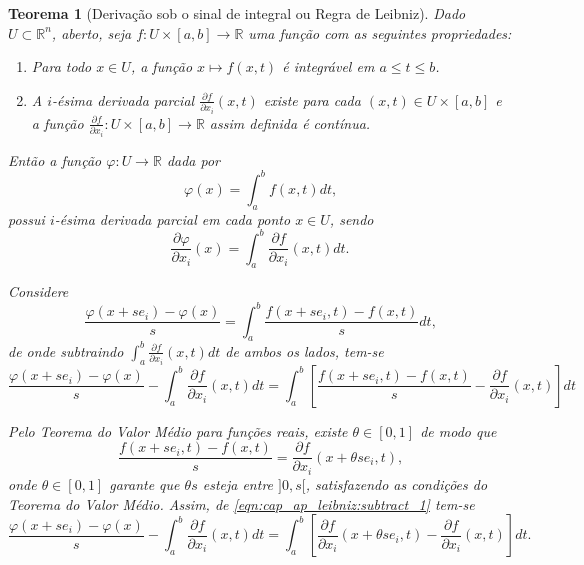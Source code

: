 \documentclass[
	12pt,				%
	openright,			%
    twoside,			%
	a4paper,			%
	chapter=TITLE,		%
	english,			%
	french,				%
	spanish,			%
	brazil				%
	]{abntex2}
\makeatletter
\newtheorem{teorema}{Teorema}
\renewenvironment{proof}[1][\proofname]{
	\par\pushQED{\qed}%
	\normalfont \topsep6\p@\@plus6\p@\relax
	\trivlist
	\item\relax
		{\itshape
			#1\@addpunct{.}}\hspace\labelsep\ignorespaces
}{%
	\popQED\endtrivlist\@endpefalse
}
\numberwithin{lema}{chapter}
\numberwithin{teorema}{chapter}
\numberwithin{definicao}{chapter}
\numberwithin{exemplo}{chapter}
\numberwithin{figure}{chapter}
\makeatother
\begin{document}
\begin{apendicesenv}
{	\begin{teorema}[Derivação sob o sinal de integral ou Regra de Leibniz]
		\label{teorema:regra_de_leibniz}
		Dado $U\subset \mathbb{R}^n$, aberto, seja $f:U\times[a,b]\longrightarrow \mathbb{R}$ uma função com as seguintes propriedades:
		\begin{enumerate}
			\item Para todo $x \in U$, a função $x \longmapsto f(x,t)$ é integrável em $a \leqslant t \leqslant b$.
			\item A $i$-ésima derivada parcial $\frac{\partial f}{\partial x_i}(x,t)$ existe para cada $(x,t)\in U\times [a,b]$ e a função $\frac{\partial f}{\partial x_i}:U\times [a,b]\longrightarrow \mathbb{R}$ assim definida é contínua.
		\end{enumerate}
		Então a função $\varphi: U\longrightarrow \mathbb{R}$ dada por
		$$\varphi(x)=\int_a^b f(x,t)dt\text{,}$$
		possui $i$-ésima derivada parcial em cada ponto $x\in U$, sendo
		$$\frac{\partial \varphi}{\partial x_i}(x)=\int_a^b \frac{\partial f}{\partial x_i}(x,t)dt\text{.}$$

		\begin{proof}
			Considere
			$$
			\frac{\varphi(x+se_i)-\varphi(x)}{s}
			=
			\int_a^b \frac{f(x+se_i, t)-f(x,t)}{s} dt\text{,}
			$$
			de onde subtraindo $\displaystyle \int_a^b \frac{\partial f}{\partial x_i}(x,t) dt$ de ambos os lados, tem-se
			\begin{equation}
			\label{eqn:cap_ap_leibniz:subtract_1}
			\frac{\varphi(x+se_i)-\varphi(x)}{s}
			- \int_a^b \frac{\partial f}{\partial x_i}(x,t) dt
			=
			\int_a^b \left [ 
				\frac{f(x+se_i, t)-f(x,t)}{s} 
				- \frac{\partial f}{\partial x_i}(x,t)
			\right ] dt
			\end{equation}
			
			Pelo Teorema do Valor Médio para funções reais, existe $\theta \in [0,1]$ de modo que
			$$
				\frac{f(x+se_i,t)-f(x,t)}{s}=\frac{\partial f}{\partial x_i}(x+\theta s e_i,t)\text{,}
			$$
			onde $\theta \in [0,1]$ garante que $\theta s$ esteja entre $]0, s[$, satisfazendo as condições do Teorema do Valor Médio. Assim, de \eqref{eqn:cap_ap_leibniz:subtract_1} tem-se
			\begin{equation}
				\label{eqn:cap_ap_leibniz:tvm}
				\frac{\varphi(x+se_i)-\varphi(x)}{s}
				- \int_a^b \frac{\partial f}{\partial x_i}(x,t) dt
				=
				\int_a^b \left [
					\frac{\partial f}{\partial x_i}(x+\theta s e_i, t)-\frac{\partial f}{\partial x_i}(x,t)
				\right ] dt\text{.}
			\end{equation}
			

\end{proof}
\end{teorema}}
\end{apendicesenv}
\end{document}
